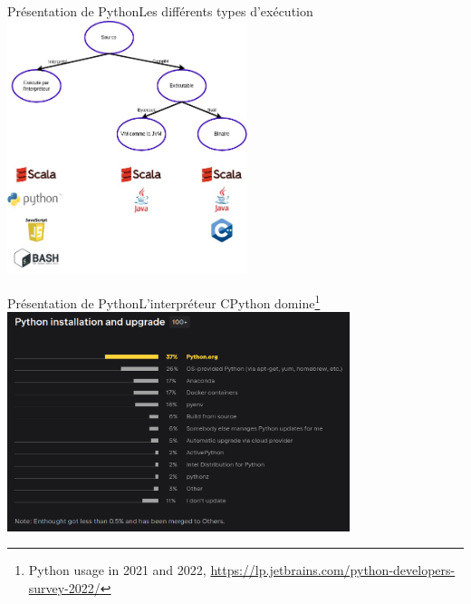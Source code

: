 \documentclass{beamer}
\begin{document}
    \begin{frame}{Présentation de Python}{Les différents types d'exécution}
        \centering
        \includegraphics[width=7cm]{image/code-inter-vs-compiled}
    \end{frame}

    \begin{frame}{Présentation de Python}{L'interpréteur CPython domine\footnote{\label{python-usage}Python usage in 2021 and 2022, \url{https://lp.jetbrains.com/python-developers-survey-2022/}}}
        \centering
        \includegraphics[width=10cm]{image/survey-install}
    \end{frame}
\end{document}
